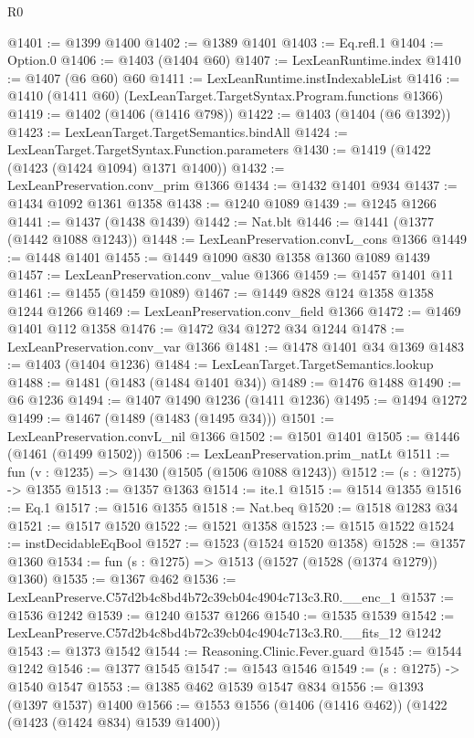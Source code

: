 \begin{lexlean}{R0}
\begin{coremodule}
@1401 := @1399 @1400
@1402 := @1389 @1401
@1403 := Eq.refl.{1}
@1404 := Option.{0}
@1406 := @1403 (@1404 @60)
@1407 := LexLeanRuntime.index
@1410 := @1407 (@6 @60) @60
@1411 := LexLeanRuntime.instIndexableList
@1416 := @1410 (@1411 @60) (LexLeanTarget.TargetSyntax.Program.functions @1366)
@1419 := @1402 (@1406 (@1416 @798))
@1422 := @1403 (@1404 (@6 @1392))
@1423 := LexLeanTarget.TargetSemantics.bindAll
@1424 := LexLeanTarget.TargetSyntax.Function.parameters
@1430 := @1419 (@1422 (@1423 (@1424 @1094) @1371 @1400))
@1432 := LexLeanPreservation.conv_prim @1366
@1434 := @1432 @1401 @934
@1437 := @1434 @1092 @1361 @1358
@1438 := @1240 @1089
@1439 := @1245 @1266
@1441 := @1437 (@1438 @1439)
@1442 := Nat.blt
@1446 := @1441 (@1377 (@1442 @1088 @1243))
@1448 := LexLeanPreservation.convL_cons @1366
@1449 := @1448 @1401
@1455 := @1449 @1090 @830 @1358 @1360 @1089 @1439
@1457 := LexLeanPreservation.conv_value @1366
@1459 := @1457 @1401 @11
@1461 := @1455 (@1459 @1089)
@1467 := @1449 @828 @124 @1358 @1358 @1244 @1266
@1469 := LexLeanPreservation.conv_field @1366
@1472 := @1469 @1401 @112 @1358
@1476 := @1472 @34 @1272 @34 @1244
@1478 := LexLeanPreservation.conv_var @1366
@1481 := @1478 @1401 @34 @1369
@1483 := @1403 (@1404 @1236)
@1484 := LexLeanTarget.TargetSemantics.lookup
@1488 := @1481 (@1483 (@1484 @1401 @34))
@1489 := @1476 @1488
@1490 := @6 @1236
@1494 := @1407 @1490 @1236 (@1411 @1236)
@1495 := @1494 @1272
@1499 := @1467 (@1489 (@1483 (@1495 @34)))
@1501 := LexLeanPreservation.convL_nil @1366
@1502 := @1501 @1401
@1505 := @1446 (@1461 (@1499 @1502))
@1506 := LexLeanPreservation.prim_natLt
@1511 := fun (v : @1235) => @1430 (@1505 (@1506 @1088 @1243))
@1512 := (s : @1275) -> @1355
@1513 := @1357 @1363
@1514 := ite.{1}
@1515 := @1514 @1355
@1516 := Eq.{1}
@1517 := @1516 @1355
@1518 := Nat.beq
@1520 := @1518 @1283 @34
@1521 := @1517 @1520
@1522 := @1521 @1358
@1523 := @1515 @1522
@1524 := instDecidableEqBool
@1527 := @1523 (@1524 @1520 @1358)
@1528 := @1357 @1360
@1534 := fun (s : @1275) => @1513 (@1527 (@1528 (@1374 @1279)) @1360)
@1535 := @1367 @462
@1536 := LexLeanPreserve.C57d2b4c8bd4b72c39cb04c4904c713c3.R0.__enc_1
@1537 := @1536 @1242
@1539 := @1240 @1537 @1266
@1540 := @1535 @1539
@1542 := LexLeanPreserve.C57d2b4c8bd4b72c39cb04c4904c713c3.R0.__fits_12 @1242
@1543 := @1373 @1542
@1544 := Reasoning.Clinic.Fever.guard
@1545 := @1544 @1242
@1546 := @1377 @1545
@1547 := @1543 @1546
@1549 := (s : @1275) -> @1540 @1547
@1553 := @1385 @462 @1539 @1547 @834
@1556 := @1393 (@1397 @1537) @1400
@1566 := @1553 @1556 (@1406 (@1416 @462)) (@1422 (@1423 (@1424 @834) @1539 @1400))

\end{coremodule}
\end{lexlean}
